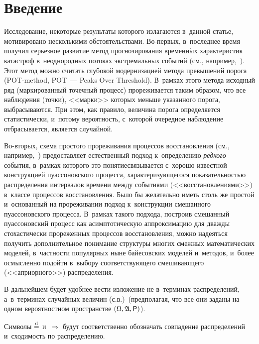 \begin{multicols}{2}

\label{st\stat}



\section{Введение}

Исследование, некоторые результаты которого излагаются в~данной
статье, мотивировано несколькими обстоятельствами. Во-пер\-вых, 
в~последнее время получил серьезное развитие метод прогнозирования
временн$\acute{\mbox{ы}}$х характеристик катастроф в~неоднородных потоках
экстремальных событий (см., например,~\cite{GrigoryevaKorolevSokolov2013}).
 Этот метод можно считать
глубокой модернизацией метода превышений порога (POT-method, POT~---
Peaks Over Threshold). В~рамках этого метода исходный ряд
(маркированный точечный процесс) прореживается таким образом, что
все наблюдения (точки), <<марки>> которых меньше указанного порога,
выбрасываются. При этом, как правило, величина порога определяется
статистически, и~потому вероятность, с~которой очередное
наблюдение отбрасывается, является случайной.

Во-вторых, схема простого прореживания процессов восстановления
(см., например,~\cite{Renyi1956-k, Mogyorodi1971}) предос\-тав\-ля\-ет
естественный подход к~определению \textit{редкого} события, в~рамках
которого это понятие\linebreak связыва\-ется с~хорошо известной конструкцией
пуассоновского процесса, 
характеризующегося показательностью распределения интервалов времени
между событиями (<<восстановлениями>>) в~классе процессов восстановления. Было бы желательно иметь
столь же простой и~основанный на прореживании подход к~конструкции
смешанного пуассоновского процесса. В~рамках такого подхода,
построив смешанный пуассоновский процесс как асимптотическую
аппроксимацию для дважды стохастически прореженных процессов
восстановления, можно надеяться получить дополнительное понимание
структуры многих смежных математических моделей, в~частности
популярных ныне байесовских моделей и~методов, и~более осмысленно
подойти в~выбору соответствующего смешивающего (<<априорного>>)
распределения.

В дальнейшем будет удобнее вести изложение не в~терминах
распределений, а~в~терминах случайных величин (с.в.)\ (предполагая,
что все они заданы на одном вероятностном пространстве
$(\Omega,\mathfrak{A}, {\sf P})$).

Символы $\stackrel{\mathrm{d}}{=}$ и~$\Longrightarrow$ будут соответственно обозначать
совпадение распределений и~сходимость по распределению.


\end{multicols}
